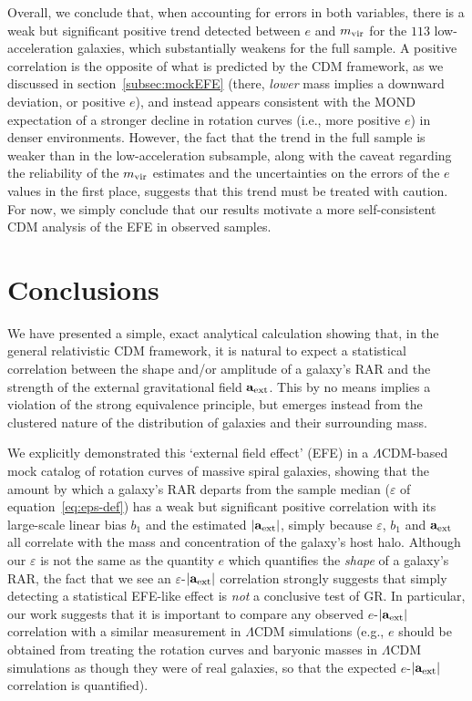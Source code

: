 \documentclass[usenatbib]{mnras}
\newcommand{\aext}{\ensuremath{\mathbf{a}_{\rm ext}}}
\begin{document}
Overall, we conclude that, when accounting for errors in both variables, there is a weak but significant positive trend detected between $e$ and $m_{\rm vir}$ for the $113$ low-acceleration galaxies, which substantially weakens for the full sample. A positive correlation is the opposite of what is predicted by the CDM framework, as we discussed in  section~\ref{subsec:mockEFE} (there, \emph{lower} mass implies a downward deviation, or positive $e$), and instead appears consistent with the MOND expectation of a stronger decline in rotation curves (i.e., more positive $e$) in denser environments. However, the fact that the trend in the full sample is weaker than in the low-acceleration subsample, along with the caveat regarding the reliability of the $m_{\rm vir}$ estimates and the uncertainties on the errors of the $e$ values in the first place, suggests that this trend must be treated with caution. For now, we simply conclude that our results motivate a more self-consistent CDM analysis of the EFE in observed samples.



\section{Conclusions}
\label{sec:conclude}
%
We have presented a simple, exact analytical calculation showing that, in the general relativistic CDM framework, it is natural to expect a statistical correlation between the shape and/or amplitude of a galaxy's RAR and the strength of the external gravitational field \aext. This by no means implies a violation of the strong equivalence principle, but emerges instead from the clustered nature of the distribution of galaxies and their surrounding mass. 

We explicitly demonstrated this `external field effect' (EFE) in a $\Lambda$CDM-based mock catalog of rotation curves of massive spiral galaxies, showing that the amount by which a galaxy's RAR departs from the sample median ($\varepsilon$ of equation~\ref{eq:eps-def}) has a weak but significant positive correlation with its large-scale linear bias $b_1$ and the estimated $|\aext|$, simply because $\varepsilon$, $b_1$ and $\aext$ all correlate with the mass and concentration of the galaxy's host halo.  Although our $\varepsilon$ is not the same as the quantity $e$ which quantifies the {\em shape} of a galaxy's RAR, the fact that we see an $\varepsilon$-$|\aext|$ correlation strongly suggests that simply detecting a statistical EFE-like effect is {\em not} a conclusive test of GR.  In particular, our work suggests that it is important to compare any observed $e$-$|\aext|$ correlation with a similar measurement in $\Lambda$CDM simulations (e.g., $e$ should be obtained from treating the rotation curves and baryonic masses in $\Lambda$CDM simulations as though they were of real galaxies, so that the expected $e$-$|\aext|$ correlation is quantified).
\end{document}
